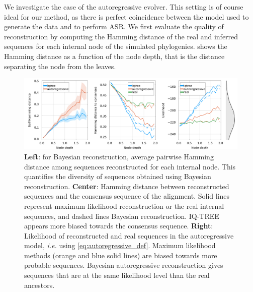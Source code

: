 We investigate the case of the autoregressive evolver. 
This setting is of course ideal for our method, as there is perfect coincidence between the model used to generate the data and to perform ASR. 
We first evaluate the quality of reconstruction by computing the Hamming distance of the real and inferred sequences for each internal node of the simulated phylogenies. 
 shows the Hamming distance as a function of the node depth, that is the distance separating the node from the leaves. 



\begin{figure}
	\centering
	\includegraphics[width = \textwidth]{figures/diversity_likelihood_arnet_PF00072.png}
	\caption{
		\textbf{Left}: for Bayesian reconstruction, average pairwise Hamming distance among sequences reconstructed for each internal node. This quantifies the diversity of sequences obtained using Bayesian reconstruction. 
		\textbf{Center}: Hamming distance between reconstructed sequences and the consensus sequence of the alignment. Solid lines represent maximum likelihood reconstruction or the real internal sequences, and dashed lines Bayesian reconstruction. IQ-TREE appears more biased towards the consensus sequence. 
		\textbf{Right}: Likelihood of reconstructed and real sequences in the autoregressive model, \emph{i.e.} using \eqref{eq:autoregressive_def}. Maximum likelihood methods (orange and blue solid lines) are biased towards more probable sequences. 
		Bayesian autoregressive reconstruction gives sequences that are at the same likelihood level than the real ancestors. 
	}
	\label{fig:diversity_likelihood_arnet}
\end{figure}


